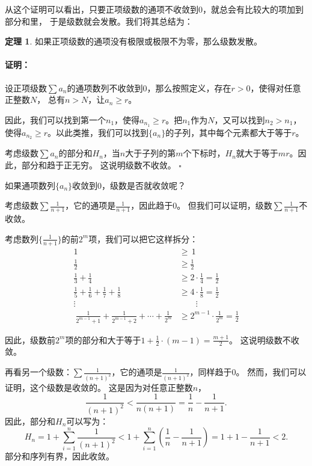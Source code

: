 \documentclass[12pt,UTF8]{ctexbook}
\theoremstyle{definition}
\newtheorem{tm}{定理}[section]
\theoremstyle{plain}
\renewenvironment{proof}{\paragraph{\textbf{证明：}}}{\hfill$\square$}
\begin{document}
从这个证明可以看出，只要正项级数的通项不收敛到$0$，就总会有比较大的项加到部分和里，
于是级数就会发散。我们将其总结为：
\begin{tm}
    如果正项级数的通项没有极限或极限不为零，那么级数发散。
\end{tm}
\begin{proof}
    设正项级数$\sum a_n$的通项数列不收敛到$0$，那么按照定义，存在$r>0$，使得对任意正整数$N$，
    总有$n > N$，让$a_n \geqslant r$。

    因此，我们可以找到第一个$n_1$，使得$a_{n_1} \geqslant r$。把$n_1$作为$N$，又可以找到$n_2 > n_1$，
    使得$a_{n_2} \geqslant r$。以此类推，我们可以找到$\{a_n\}$的子列，其中每个元素都大于等于$r$。

    考虑级数$\sum a_n$的部分和$H_n$，当$n$大于子列的第$m$个下标时，$H_n$就大于等于$mr$。因此，部分和趋于正无穷。
    这说明级数不收敛。
\end{proof}

如果通项数列$\{a_n\}$收敛到$0$，级数是否就收敛呢？

考虑级数$\sum \frac{1}{n+1}$，它的通项是$\frac{1}{n+1}$，因此趋于$0$。
但我们可以证明，级数$\sum \frac{1}{n+1}$不收敛。

考虑数列$\{\frac{1}{n+1}\}$的前$2^m$项，我们可以把它这样拆分：
\begin{align*}
    1 \, &\geqslant \, 1  \\
    \frac{1}{2} &\geqslant \frac{1}{2}  \\
    \frac{1}{3} + \frac{1}{4} &\geqslant 2 \cdot \frac{1}{4} = \frac{1}{2}  \\
    \frac{1}{5} + \frac{1}{6} + \frac{1}{7} + \frac{1}{8} &\geqslant 4 \cdot \frac{1}{8} = \frac{1}{2}  \\
    \vdots \qquad & \qquad \vdots  \\\
    \frac{1}{2^{m-1}+1} + \frac{1}{2^{m-1}+2} + \cdots + \frac{1}{2^{m}} &\geqslant 2^{m-1} \cdot \frac{1}{2^{m}} = \frac{1}{2}  
\end{align*}

因此，级数前$2^m$项的部分和大于等于$1 + \frac12 \cdot (m - 1) = \frac{m+1}{2}$。
这说明级数不收敛。

再看另一个级数：$\sum \frac{1}{(n+1)^2}$，它的通项是$\frac{1}{(n+1)^2}$，同样趋于$0$。
然而，我们可以证明，这个级数是收敛的。
这是因为对任意正整数$n$，
$$ \frac{1}{(n+1)^2} < \frac{1}{n(n+1)} = \frac{1}{n} - \frac{1}{n+1}.$$
因此，部分和$H_n$可以写为：
$$ H_n = 1 + \sum_{i=1}^n \frac{1}{(n+1)^2} < 1 + \sum_{i=1}^n \left(\frac{1}{n} - \frac{1}{n+1}\right) = 1 + 1 - \frac{1}{n+1} < 2. $$
部分和序列有界，因此收敛。
\end{document}
